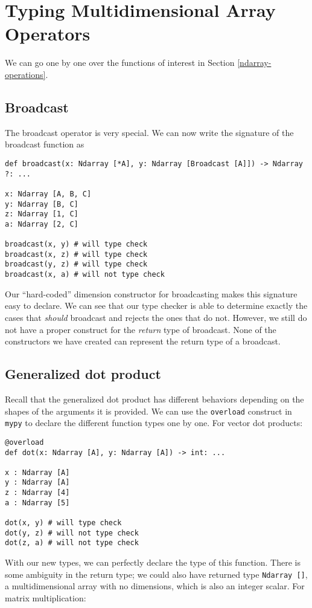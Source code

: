 \documentclass{report}
\begin{document}
\section{Typing Multidimensional Array Operators}
\label{type-examples}

We can go one by one over the functions of interest in Section \ref{ndarray-operations}.

\subsection{Broadcast}

The broadcast operator is very special. We can now write the signature of the broadcast function as

\begin{singlespace*}
\begin{verbatim}
def broadcast(x: Ndarray [*A], y: Ndarray [Broadcast [A]]) -> Ndarray ?: ...

x: Ndarray [A, B, C]
y: Ndarray [B, C]
z: Ndarray [1, C]
a: Ndarray [2, C]

broadcast(x, y) # will type check
broadcast(x, z) # will type check
broadcast(y, z) # will type check
broadcast(x, a) # will not type check\end{verbatim}
\end{singlespace*}
Our ``hard-coded'' dimension constructor for broadcasting makes this signature easy to declare. We can see that our type checker is able to determine exactly the cases that \textit{should} broadcast and rejects the ones that do not. However, we still do not have a proper construct for the \textit{return} type of broadcast. None of the constructors we have created can represent the return type of a broadcast.

\subsection{Generalized dot product}
Recall that the generalized dot product has different behaviors depending on the shapes of the arguments it is provided. We can use the \texttt{overload} construct in \texttt{mypy} to declare the different function types one by one. For vector dot products:

\begin{singlespace*}
\begin{verbatim}
@overload
def dot(x: Ndarray [A], y: Ndarray [A]) -> int: ...

x : Ndarray [A]
y : Ndarray [A]
z : Ndarray [4]
a : Ndarray [5]

dot(x, y) # will type check
dot(y, z) # will not type check
dot(z, a) # will not type check
\end{verbatim}
\end{singlespace*}
With our new types, we can perfectly declare the type of this function. There is some ambiguity in the return type; we could also have returned type \texttt{Ndarray []}, a multidimensional array with no dimensions, which is also an integer scalar. For matrix multiplication:
\end{document}
